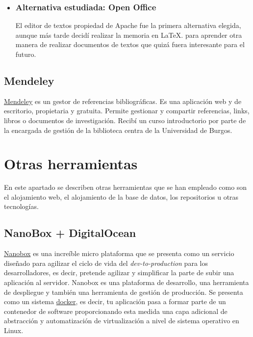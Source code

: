  \begin{itemize}
 	\item 	\subsubsection{Alternativa estudiada: Open Office}\label{openoffice}
El editor de textos propiedad de Apache fue la primera alternativa elegida, aunque más tarde decidí realizar la memoria en La\TeX. para aprender otra manera de realizar documentos de textos que quizá fuera interesante para el futuro.
\end{itemize}

 \subsection{Mendeley}\label{docs_mendeley}
  \href{www.mendeley.com/}{Mendeley} es un gestor de referencias bibliográficas. Es una aplicación web y de escritorio, propietaria y gratuita. Permite gestionar y compartir referencias, links, libros o documentos de investigación. Recibí un curso introductorio por parte de la encargada  de gestión de la biblioteca centra de la Universidad de Burgos.
  
  \section{Otras herramientas}\label{otrasherramientas}
En este apartado se describen otras herramientas que se han empleado como son el alojamiento web, el alojamiento de la base de datos, los repositorios u otras tecnologías.

 \subsection{NanoBox + DigitalOcean}
\href{https://nanobox.io/}{Nanobox}  es una increíble micro plataforma  que se presenta como un servicio diseñado para agilizar el ciclo de vida del \emph{dev-to-production} para los desarrolladores, es decir, pretende agilizar y simplificar la parte de subir una aplicación al servidor. Nanobox es una plataforma de desarrollo, una herramienta de despliegue y también una herramienta de gestión de producción. Se presenta como un sistema \href{https://es.wikipedia.org/wiki/Docker_(software)}{docker}, es decir, tu aplicación pasa a formar parte de un contenedor de software proporcionando esta medida una capa adicional de abstracción y automatización de virtualización a nivel de sistema operativo en Linux. 

